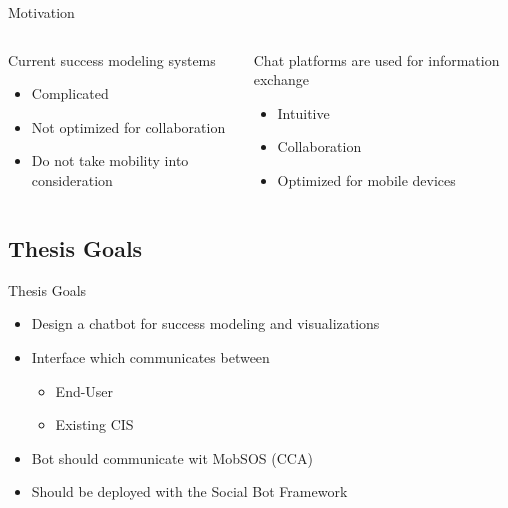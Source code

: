 \begin{frame}{Motivation}
  \begin{columns}
    \begin{column}[]{0.5\textwidth}

      Current success modeling systems
      \begin{itemize}
        \item Complicated %
        \item Not optimized for collaboration
        \item Do not take mobility into consideration
      \end{itemize}

    \end{column}
    \begin{column}[]{0.5\textwidth}
      Chat platforms are used for information exchange
      \begin{itemize}
        \item Intuitive
        \item Collaboration
        \item Optimized for mobile devices
      \end{itemize}
    \end{column}
  \end{columns}

\end{frame}


\subsection{Thesis Goals}

\begin{frame}{Thesis Goals}
  \begin{itemize}
    \item Design a chatbot for success modeling and visualizations
    \item Interface which communicates between
          \begin{itemize}
            \item End-User
            \item Existing CIS
          \end{itemize}
    \item Bot should communicate wit MobSOS (CCA) %
    \item Should be deployed with the Social Bot Framework
  \end{itemize}
\end{frame}

